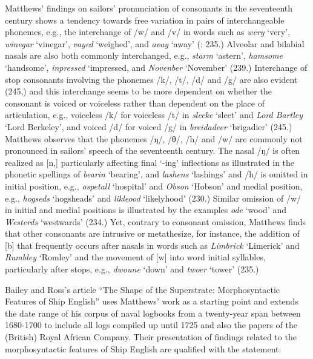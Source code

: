 Matthews’ findings on sailors’ pronunciation of consonants in the seventeenth century shows a tendency towards free variation in pairs of interchangeable phonemes, e.g., the interchange of /w/ and /v/ in words such as \textit{wery} ‘very’, \textit{winegar} ‘vinegar’, \textit{vayed} ‘weighed’, and \textit{avay} ‘away’ (\citealt{Matthews1935}: 235.) Alveolar and bilabial nasals are also both commonly interchanged, e.g., \textit{starm} ‘astern’, \textit{hamsome} ‘handsome’, \textit{inpressed} ‘impressed, and \textit{Novenber} ‘November’ (239.) Interchange of stop consonants involving the phonemes /k/, /t/, /d/ and /g/ are also evident (245,) and this interchange seems to be more dependent on whether the consonant is voiced or voiceless rather than dependent on the place of articulation, e.g., voiceless /k/ for voiceless /t/ in \textit{sleeke} ‘sleet’ and \textit{Lord Bartley} ‘Lord Berkeley’, and voiced /d/ for voiced /g/ in \textit{breidadeer} ‘brigadier’ (245.) Matthews observes that the phonemes /ŋ/, /θ/, /h/ and /w/ are commonly not pronounced in sailors’ speech of the seventeenth century. The nasal /ŋ/ is often realized as [n,] particularly affecting final ‘-ing’ inflections as illustrated in the phonetic spellings of \textit{bearin} ‘bearing’, and \textit{lashens} ‘lashings’  and /h/ is omitted in initial position, e.g., \textit{ospetall} ‘hospital’ and \textit{Obson} ‘Hobson’ and medial position, e.g., \textit{hogseds} ‘hogsheads’ and \textit{likleood} ‘likelyhood’ (230.) Similar omission of /w/ in initial and medial positions is illustrated by the examples \textit{ode} ‘wood’ and \textit{Westerds} ‘westwards’ (234.) Yet, contrary to consonant omission, Matthews finds that other consonants are intrusive or metathesize, for instance, the addition of [b] that frequently occurs after nasals in words such as \textit{Limbrick} ‘Limerick’ and \textit{Rumbley} ‘Romley’  and the movement of [w] into word initial syllables, particularly after stops, e.g., \textit{dwoune} ‘down’ and \textit{twoer} ‘tower’ (235.)

Bailey and Ross’s article “The Shape of the Superstrate: Morphosyntactic Features of Ship English”  uses Matthews’ work as a starting point and extends the date range of his corpus of naval logbooks from a twenty-year span between 1680-1700 to include all logs compiled up until 1725 and also the papers of the (British) Royal African Company. Their presentation of findings related to the morphosyntactic features of Ship English are qualified with the statement:

